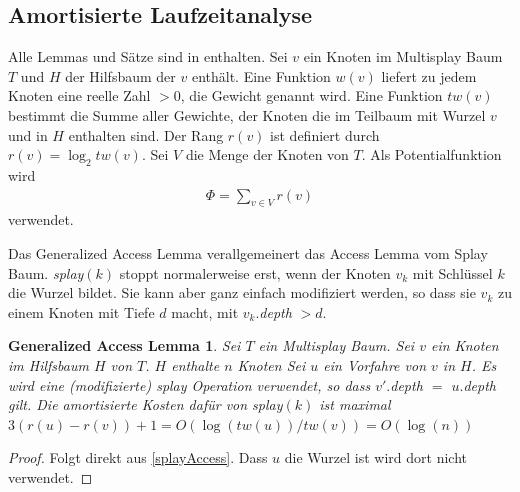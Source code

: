 \documentclass[a4paper,12pt]{article}
\begin{document}
\subsection{Amortisierte Laufzeitanalyse}
Alle Lemmas und Sätze sind in \cite{multisplay} enthalten.
Sei $v$ ein Knoten im Multisplay Baum $T$ und $H$ der Hilfsbaum der $v$ enthält. Eine Funktion $w\left(v\right)$ liefert zu jedem Knoten eine reelle Zahl $>0$, die Gewicht genannt wird. Eine Funktion $\mathit{tw}\left(v\right)$ bestimmt die Summe aller Gewichte, der Knoten die im Teilbaum mit Wurzel $v$ und in $H$ enthalten sind. Der Rang  $r\left(v\right)$ ist definiert durch $r\left(v\right) = \log_2  \mathit{tw}\left(v\right)$. Sei $V$ die Menge der Knoten von $T$. Als Potentialfunktion wird 
\begin{align*}
\Phi = \sum_{v \in V} r\left(v\right)
\end{align*}
verwendet.

\noindent Das Generalized Access Lemma verallgemeinert das Access Lemma vom Splay Baum. \textit{splay}$\left(k\right)$ stoppt normalerweise erst, wenn der Knoten $v_k$ mit Schlüssel $k$ die Wurzel bildet. Sie kann aber ganz einfach modifiziert werden, so dass sie $v_k$ zu einem Knoten mit Tiefe $d$ macht, mit $v_k.$\textit{depth} $> d $.

\newtheorem{Lemma1}{Generalized Access Lemma}[section] 
\begin{Lemma1}Sei $T$ ein Multisplay Baum. Sei $v$ ein Knoten im Hilfsbaum $H$ von $T$. $H$ enthalte $n$ Knoten Sei $u$ ein Vorfahre von $v$ in $H$. Es wird eine (modifizierte) \textit{splay} Operation verwendet, so dass $v'.$\textit{depth} $=$ $u.$\textit{depth} gilt.  Die amortisierte Kosten dafür von \textit{splay}$\left(k\right)$ ist maximal $3 \left(r\left(u\right) - r\left(v\right)\right) + 1 = O\left(\log\left(\mathit{tw}\left(u\right)\right)  / \mathit{tw}\left(v\right) \right) = O\left(\log\left(n\right)\right)$ \\	
\end{Lemma1}
\begin{proof}
Folgt direkt aus \ref{splayAccess}. Dass $u$ die Wurzel ist wird dort nicht verwendet. 	
	
\end{proof}
\newtheorem{Lemma2}{Multisplay Baum Access Lemma}[section] \label{lemmaMultiSplay}
\end{document}
